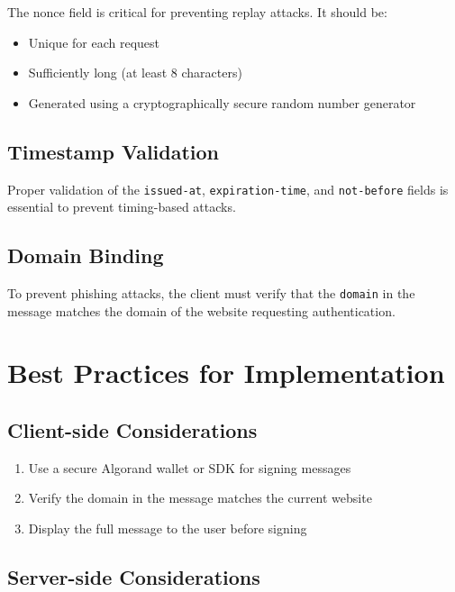\documentclass[12pt, a4paper, twocolumn]{article}
\begin{document}
The nonce field is critical for preventing replay attacks. It should be:

\begin{itemize}[label=\textendash, itemsep=-0.5em]
  \item Unique for each request
  \item Sufficiently long (at least 8 characters)
  \item Generated using a cryptographically secure random number generator
\end{itemize}

\subsection{Timestamp Validation}

Proper validation of the \verb=issued-at=, \verb=expiration-time=, and \verb=not-before= fields is essential to prevent timing-based attacks.

\subsection{Domain Binding}

To prevent phishing attacks, the client must verify that the \verb=domain= in the message matches the domain of the website requesting authentication.

\section{Best Practices for Implementation}

\subsection{Client-side Considerations}

\begin{enumerate}
  \item Use a secure Algorand wallet or SDK for signing messages
  \item Verify the domain in the message matches the current website
  \item Display the full message to the user before signing
\end{enumerate}

\subsection{Server-side Considerations}
\end{document}
